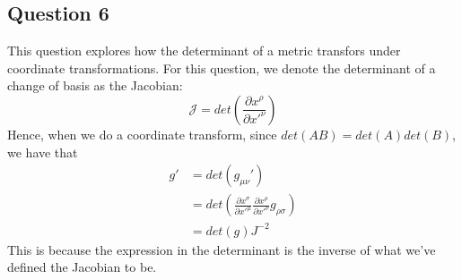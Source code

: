 \subsection{Question 6} 
This question explores how the determinant of a metric transfors under coordinate transformations. For this question, we denote the determinant of a change of basis as the Jacobian: 
\[ 
\mathcal{ J } = det \left( \frac{ \partial x^\rho }{ \partial x'^\nu } \right) 
\]  
Hence, when we do a coordinate transform, since $det( AB ) = det( A ) det( B) $, we have that
\begin{align*} 
g' &= det (g_{ \mu \nu }' ) \\
&= det \left( \frac{ \partial x^\sigma}{ \partial x'^\mu } \frac{ \partial x^\rho }{ \partial x'^\nu } g_{ \rho \sigma } \right) \\
&= det(g) J^{ -2 } 
\end{align*} 
This is because the expression in the determinant is the inverse of what we've defined the Jacobian to be.



\pagebreak 

